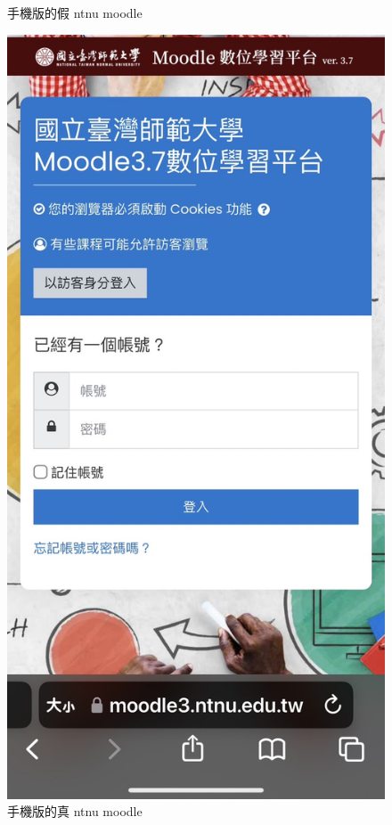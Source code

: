 \documentclass[a4paper,12pt]{article}
\begin{document}
\begin{figure}[ht!]
\begin{minipage}{0.45\textwidth}
        \caption{手機版的假 ntnu moodle}
        \label{fig:fake_site}
    \end{minipage}
    \hfill
    \begin{minipage}{0.45\textwidth}
        \centering
        \includegraphics[width=\textwidth]{phone_real.jpg}
        \caption{手機版的真 ntnu moodle}
        \label{fig:real_site}
    \end{minipage}
\end{figure}
\end{document}

